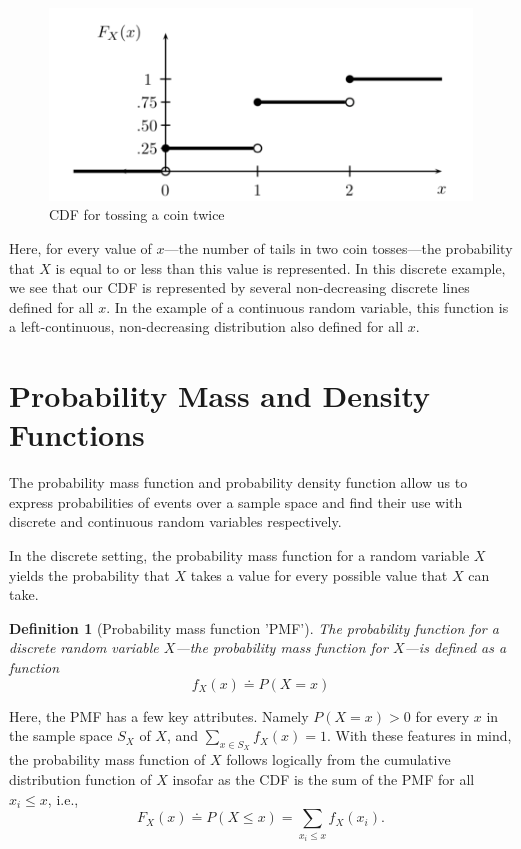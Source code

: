 \documentclass[
  12pt,
]{book}
\theoremstyle{definition}
\newtheorem{definition}{Definition}[chapter]
\theoremstyle{definition}
\theoremstyle{definition}
\theoremstyle{remark}
\begin{document}
\begin{figure}

{\centering \includegraphics[width=0.7\linewidth]{./images/cdf} 

}

\caption{CDF for tossing a coin twice \citep{Wasserman2004}}\label{fig:cdfimg}
\end{figure}

Here, for every value of \(x\)---the number of tails in two coin tosses---the probability that \(X\) is equal to or less than this value is represented.
In this discrete example, we see that our CDF is represented by several non-decreasing discrete lines defined for all \(x\).
In the example of a continuous random variable, this function is a left-continuous, non-decreasing distribution also defined for all \(x\).

\hypertarget{probability-mass-and-density-functions}{%
\section{Probability Mass and Density Functions}\label{probability-mass-and-density-functions}}

The probability mass function and probability density function allow us to express probabilities of events over a sample space and find their use with discrete and continuous random variables respectively.

In the discrete setting, the probability mass function for a random variable \(X\) yields the probability that \(X\) takes a value for every possible value that \(X\) can take.

\begin{definition}[Probability mass function 'PMF']
\protect\hypertarget{def:pmf}{}{\label{def:pmf} {} }\emph{The probability function for a discrete random variable \(X\)---the probability mass function for \(X\)---is defined as a function}
\[f_{X}(x) \doteq P(X=x)\]
\end{definition}

Here, the PMF has a few key attributes.
Namely \(P(X=x)>0\) for every \(x\) in the sample space \(S_{X}\) of \(X\), and \(\sum_{x \in S_{X}}f_{X}(x)=1\).
With these features in mind, the probability mass function of \(X\) follows logically from the cumulative distribution function of \(X\) insofar as the CDF is the sum of the PMF for all \(x_{i}≤x\), i.e., \[F_{X}(x) \doteq P(X≤x)=\sum_{x_i≤x}f_{X}(x_{i}).\]
\end{document}
